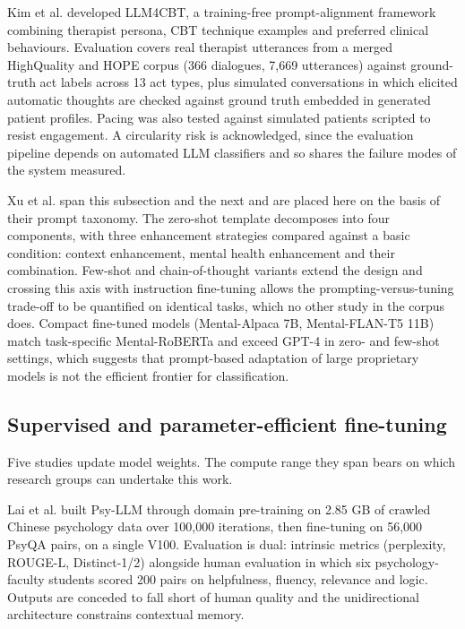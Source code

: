 \documentclass[11pt]{article}
\begin{document}
	Kim et al.\cite{fpsyt.2025.1583739} developed LLM4CBT, a training-free prompt-alignment framework combining therapist persona, CBT technique examples and preferred clinical behaviours. Evaluation covers real therapist utterances from a merged HighQuality and HOPE corpus (366 dialogues, 7,669 utterances) against ground-truth act labels across 13 act types, plus simulated conversations in which elicited automatic thoughts are checked against ground truth embedded in generated patient profiles. Pacing was also tested against simulated patients scripted to resist engagement. A circularity risk is acknowledged, since the evaluation pipeline depends on automated LLM classifiers and so shares the failure modes of the system measured.
	
	Xu et al.\cite{Xu_2024} span this subsection and the next and are placed here on the basis of their prompt taxonomy. The zero-shot template decomposes into four components, with three enhancement strategies compared against a basic condition: context enhancement, mental health enhancement and their combination. Few-shot and chain-of-thought variants extend the design and crossing this axis with instruction fine-tuning allows the prompting-versus-tuning trade-off to be quantified on identical tasks, which no other study in the corpus does. Compact fine-tuned models (Mental-Alpaca 7B, Mental-FLAN-T5 11B) match task-specific Mental-RoBERTa and exceed GPT-4 in zero- and few-shot settings, which suggests that prompt-based adaptation of large proprietary models is not the efficient frontier for classification.
	
	\subsection{Supervised and parameter-efficient fine-tuning}
	
	Five studies update model weights. The compute range they span bears on which research groups can undertake this work.
	
	Lai et al.\cite{lai2023psyllmscalingglobalmental} built Psy-LLM through domain pre-training on 2.85 GB of crawled Chinese psychology data over 100,000 iterations, then fine-tuning on 56,000 PsyQA pairs, on a single V100. Evaluation is dual: intrinsic metrics (perplexity, ROUGE-L, Distinct-1/2) alongside human evaluation in which six psychology-faculty students scored 200 pairs on helpfulness, fluency, relevance and logic. Outputs are conceded to fall short of human quality and the unidirectional architecture constrains contextual memory.
	
\end{document}
